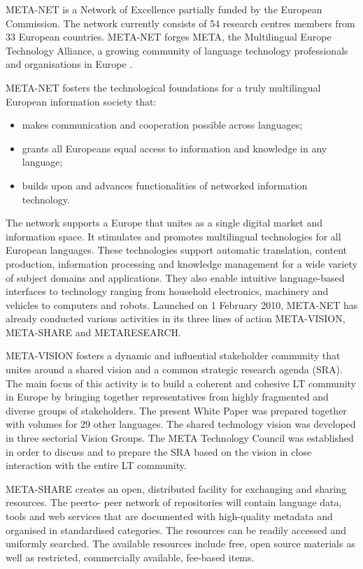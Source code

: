 \begin{multicols}{2}

META-NET is a Network of Excellence partially funded by the European Commission. The network currently consists of 54 research centres members from 33 European countries. META-NET forges META, the Multilingual Europe Technology Alliance, a growing community of language technology professionals and organisations in Europe  \cite{art10}. 

META-NET fosters the technological foundations for a truly multilingual European information society that: 
\begin{itemize}
\item makes communication and cooperation possible across languages;
\item grants all Europeans equal access to information and knowledge in any language;
\item builds upon and advances functionalities of networked information technology.
\end{itemize}

The network supports a Europe that unites as a single digital market and information space. It stimulates and promotes multilingual technologies for all European languages. These technologies support automatic translation, content production, information processing and knowledge management for a wide variety of subject domains and applications. They also enable intuitive language-based interfaces to technology ranging from household electronics, machinery and vehicles to computers and robots. Launched on 1 February 2010, META-NET has already conducted various activities in its three lines of action META-VISION, META-SHARE and METARESEARCH. 

META-VISION fosters a dynamic and influential stakeholder community that unites around a shared vision and a common strategic research agenda (SRA). The main focus of this activity is to build a coherent and cohesive LT community in Europe by bringing together representatives from highly fragmented and diverse groups of stakeholders. The present White Paper was prepared together with volumes for 29 other languages. The shared technology vision was developed in three sectorial Vision Groups. The META Technology Council was established in order to discuss and to prepare the SRA based on the vision in close interaction with the entire LT community. 

META-SHARE creates an open, distributed facility for exchanging and sharing resources. The peerto- peer network of repositories will contain language data, tools and web services that are documented with high-quality metadata and organised in standardised categories. The resources can be readily accessed and uniformly searched. The available resources include free, open source materials as well as restricted, commercially available, fee-based items. 


\end{multicols}
